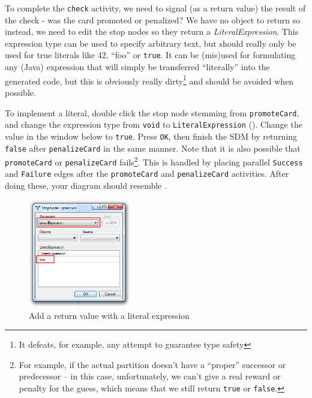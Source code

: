 \begin{stepbystep}
\vspace{0.5cm}

To complete the \texttt{check} activity, we need to signal (as a return value) the result of the check - was the card promoted or penalized? We have no object
to return so instead, we need to edit the stop nodes so they return a \emph{LiteralExpression}. This expression type can be used to
specify arbitrary text, but should really only be used for true literals like 42, ``foo'' or \texttt{true}. It can be (mis)used for formulating any (Java)
expression that will simply be transferred ``literally'' into the generated code, but this is obviously really dirty\footnote{It defeats, for example, any
attempt to guarantee type safety} and should be avoided when possible.

\vspace{0.5cm}

\item To implement a literal, double click the stop node stemming from  \texttt{promoteCard}, and change the expression type from
\texttt{void} to \texttt{LiteralEx\-pression} (). Change the value in the window below to \texttt{true}. Press \texttt{OK},
then finish the SDM by returning \texttt{false} after \texttt{penalizeCard} in the same manner. Note that it is also possible that \texttt{promoteCard} or 
\texttt{penalizeCard} fails\footnote{For example, if the actual partition doesn't have a ``proper'' successor or predecessor -- in this case, unfortunately, we can't 
give a real reward or penalty for the guess, which means that we still return \texttt{true} or \texttt{false}.}. This is handled by placing parallel \texttt{Success} 
and \texttt{Failure} edges after the \texttt{promoteCard} and \texttt{penalizeCard} activities. After doing these, your diagram should 
resemble .

\begin{figure}[htbp]
\begin{center}
  \includegraphics[width=0.4\textwidth]{../../org.moflon.doc.handbook.03_storyDiagrams/04_checkCard/visCheImages/ea_stopNodeLiteral}
  \caption{Add a return value with a literal expression}
  \label{ea:sdm_check_literal_exp}
\end{center}
\end{figure}


\end{stepbystep}
